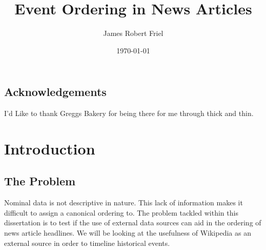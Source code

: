 \documentclass[bsc,frontabs,twoside,singlespacing,parskip,deptreport]{infthesis}     %
\begin{document}
\title{Event Ordering in News Articles}

\author{James Robert Friel}
 

\date{\today}

\abstract{}


\maketitle

\section*{Acknowledgements}
I'd Like to thank Greggs Bakery for being there for me through thick and thin.

\tableofcontents



\chapter{Introduction}
\section{The Problem}
Nominal data is not descriptive in nature. This lack of information makes it difficult to assign
a canonical ordering to.
The problem tackled within this dissertation is to test if the use of external data sources can
aid in the ordering of news article headlines.
We will be looking at the usefulness of Wikipedia as an external source in order to timeline
historical events.
\end{document}
